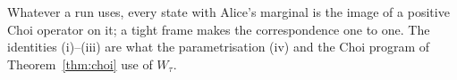 
Whatever  a run uses, every state with Alice's marginal is the
image of a positive Choi operator on it; a tight frame makes the
correspondence one to one. The identities (i)--(iii) are what the
parametrisation (iv) and the Choi program of Theorem~\ref{thm:choi} use of
$W_{\tau}$.

